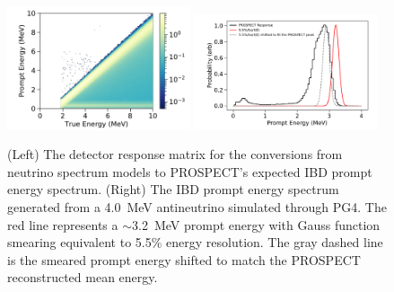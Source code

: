 \begin{figure}[h!]
\centering
\includegraphics[width=0.48\textwidth]{Figures/FullResponse.pdf}
\includegraphics[width=0.48\textwidth]{Figures/MonoResponse.pdf}
\caption[Detector response matrix]{(Left) The detector response matrix for the conversions from neutrino spectrum models to PROSPECT's expected IBD prompt energy spectrum.
(Right) The IBD prompt energy spectrum generated from a 4.0~MeV antineutrino simulated through PG4. 
The red line represents a $\sim$3.2~MeV prompt energy with Gauss function smearing equivalent to 5.5\% energy resolution.
The gray dashed line is the smeared prompt energy shifted to match the PROSPECT reconstructed mean energy.}
\label{fig:responsematrix}
\end{figure}

